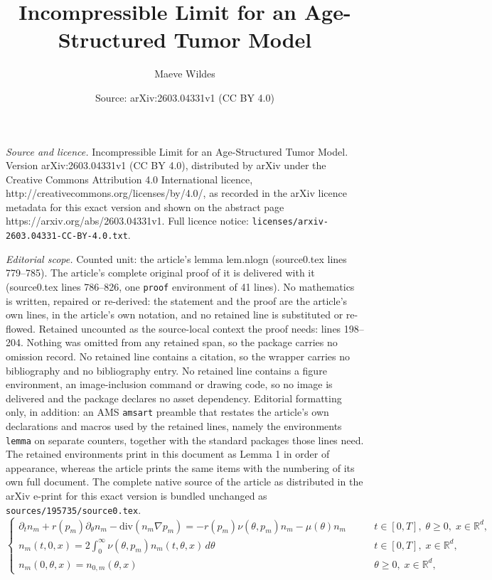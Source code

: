 \documentclass[10pt,a4paper]{amsart}
\title{Incompressible Limit for an Age-Structured Tumor Model}
\author{Maeve Wildes}
\date{Source: arXiv:2603.04331v1 (CC BY 4.0)}
\def\R{\mathbb R}
\begin{document}
\maketitle

\noindent\emph{Source and licence.} Incompressible Limit for an Age-Structured Tumor Model. Version arXiv:2603.04331v1 (CC BY 4.0), distributed by arXiv under the Creative Commons Attribution 4.0 International licence, http://creativecommons.org/licenses/by/4.0/, as recorded in the arXiv licence metadata for this exact version and shown on the abstract page https://arxiv.org/abs/2603.04331v1. Full licence notice: \texttt{licenses/arxiv-2603.04331-CC-BY-4.0.txt}.\par\smallskip

\noindent\textit{Editorial scope.} Counted unit: the article's lemma lem.nlogn (source0.tex lines 779--785). The article's complete original proof of it is delivered with it (source0.tex lines 786--826, one \texttt{proof} environment of 41 lines). No mathematics is written, repaired or re-derived: the statement and the proof are the article's own lines, in the article's own notation, and no retained line is substituted or re-flowed.  Retained uncounted as the source-local context the proof needs: lines 198--204.  Nothing was omitted from any retained span, so the package carries no omission record.  No retained line contains a citation, so the wrapper carries no bibliography and no bibliography entry.  No retained line contains a figure environment, an image-inclusion command or drawing code, so no image is delivered and the package declares no asset dependency.  Editorial formatting only, in addition: an AMS \texttt{amsart} preamble that restates the article's own declarations and macros used by the retained lines, namely the environments \texttt{lemma} on separate counters, together with the standard packages those lines need.  The retained environments print in this document as Lemma 1 in order of appearance, whereas the article prints the same items with the numbering of its own full document.  The complete native source of the article as distributed in the arXiv e-print for this exact version is bundled unchanged as \texttt{sources/195735/source0.tex}.
\begin{equation}\label{nm}
    \begin{cases}
        \partial_t n_m+r(p_m)\partial_\theta n_m-\text{div}(n_m \nabla p_m)=-r(p_m)\nu(\theta,p_m)n_m-\mu(\theta)n_m \qquad &t \in [0,T],\; \theta \geq 0,\; x \in \R^d,\\
        n_m(t,0,x)=2\int_{0}^{\infty}\nu(\theta,p_m) n_m(t,\theta,x)\,d\theta \qquad &t \in [0,T],\; x \in \R^d, \\
        n_m(0,\theta,x)=n_{0,m}(\theta,x) \qquad &\theta\geq 0,\; x \in \R^d,
    \end{cases}
\end{equation}
\end{document}

